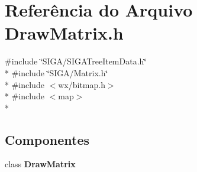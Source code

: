 \section{Referência do Arquivo Draw\+Matrix.\+h}
\label{_draw_matrix_8h}
{\ttfamily \#include \char`\"{}S\+I\+G\+A/\+S\+I\+G\+A\+Tree\+Item\+Data.\+h\char`\"{}}\\*
{\ttfamily \#include \char`\"{}S\+I\+G\+A/\+Matrix.\+h\char`\"{}}\\*
{\ttfamily \#include $<$wx/bitmap.\+h$>$}\\*
{\ttfamily \#include $<$map$>$}\\*
\subsection*{Componentes}
\begin{DoxyCompactItemize}
\item 
class {\bf Draw\+Matrix}
\end{DoxyCompactItemize}
